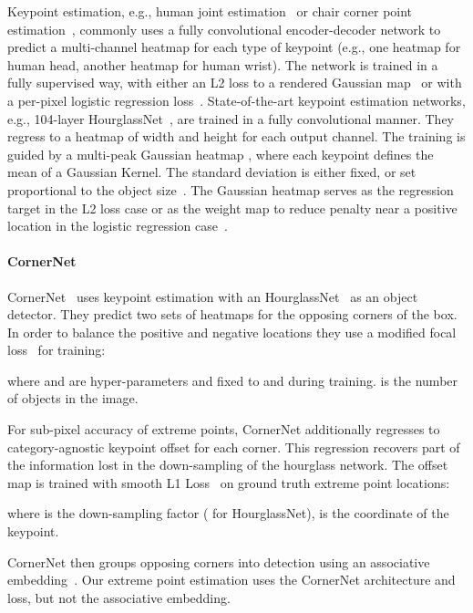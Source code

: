 \documentclass[10pt,twocolumn,letterpaper]{article}
\begin{document}
Keypoint estimation, e.g., human joint estimation~\cite{newell2017associative,cao2017realtime,Chen_2018_CVPR,xiao2018simple,he2017mask} or chair corner point estimation~\cite{zhou2018starmap,pavlakos20176}, commonly uses a fully convolutional encoder-decoder network to predict a multi-channel heatmap for each type of keypoint (e.g., one heatmap for human head, another heatmap for human wrist).
The network is trained in a fully supervised way, with either an L2 loss to a rendered Gaussian map~\cite{newell2017associative,cao2017realtime,Chen_2018_CVPR,xiao2018simple} or with a per-pixel logistic regression loss~\cite{papandreou2017towards,papandreou2018personlab,Law_2018_ECCV}.
State-of-the-art keypoint estimation networks, e.g., 104-layer HourglassNet~\cite{newell2016stacked,Law_2018_ECCV}, are trained in a fully convolutional manner.
They regress to a heatmap  of width  and height  for each output channel.
The training is guided by a multi-peak Gaussian heatmap , where each keypoint defines the mean of a Gaussian Kernel.
The standard deviation is either fixed, or set proportional to the object size~\cite{Law_2018_ECCV}.
The Gaussian heatmap serves as the regression target in the L2 loss case or as the weight map to reduce penalty near a positive location in the logistic regression case~\cite{Law_2018_ECCV}. 

\paragraph{CornerNet}
CornerNet~\cite{Law_2018_ECCV} uses keypoint estimation with an HourglassNet~\cite{newell2016stacked} as an object detector.
They predict two sets of heatmaps for the opposing corners of the box.
In order to balance the positive and negative locations they use a modified focal loss~\cite{lin2018focal} for training:

where  and  are hyper-parameters and fixed to  and  during training.
 is the number of objects in the image.

For sub-pixel accuracy of extreme points, CornerNet additionally regresses to category-agnostic keypoint offset  for each corner.
This regression recovers part of the information lost in the down-sampling of the hourglass network.
The offset map is trained with smooth L1 Loss~\cite{girshick2015fast}  on ground truth extreme point locations:

where  is the down-sampling factor ( for HourglassNet),  is the coordinate of the keypoint.

CornerNet then groups opposing corners into detection using an associative embedding~\cite{newell2017associative}.
Our extreme point estimation uses the CornerNet architecture and loss, but not the associative embedding.
\end{document}
